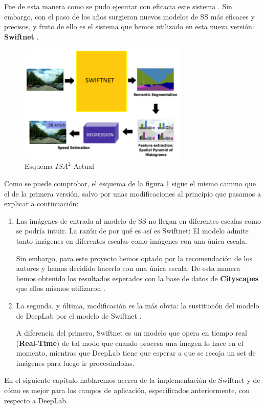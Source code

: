 Fue de esta manera como se pudo ejecutar con eficacia este sistema \cite{isa2}. Sin embargo, con el paso de los años surgieron nuevos modelos de \ac{SS} más eficaces y precisos, y fruto de ello es el sistema que hemos utilizado en esta nueva versión: \textbf{Swiftnet} \cite{swiftnet}.


\begin{figure}[H]
  \centering
  \includegraphics[width=8cm]{Figuras/Figura_Esquema_ISA2_Version_2.eps}
  \caption{Esquema $ISA^{2}$ Actual}
    \label{fig:Isa_v2}
\end{figure}


Como se puede comprobar, el esquema de la figura \ref{fig:Isa_v2} sigue el mismo camino que el de la primera versión, salvo por unas modificaciones al principio que pasamos a explicar a continuación:

\begin{enumerate}

\item Las imágenes de entrada al modelo de \ac{SS} no llegan en diferentes escalas como se podría intuir. La razón de por qué es así es Swiftnet: El modelo admite tanto imágenes en diferentes escalas como imágenes con una única escala.


Sin embargo, para este proyecto hemos optado por la recomendación de los autores \cite{github_swiftnet} y hemos decidido hacerlo con una única escala. De esta manera hemos obtenido los resultados esperados con la base de datos de \textbf{Cityscapes} \cite{cityscapes} que ellos mismos utilizaron \cite{swiftnet}.

\item La segunda, y última, modificación es la más obvia: la sustitución del modelo de DeepLab \cite{deeplab} por el modelo de Swiftnet \cite{swiftnet}.

A diferencia del primero, Swiftnet es un modelo que opera en tiempo real (\textbf{Real-Time}) de tal modo que cuando procesa una imagen lo hace en el momento, mientras que DeepLab tiene que esperar a que se recoja un set de imágenes para luego ir procesándolas.

\end{enumerate}


En el siguiente capítulo hablaremos acerca de la implementación de Swiftnet y de cómo es mejor para los campos de aplicación, especificados anteriormente, con respecto a DeepLab.
